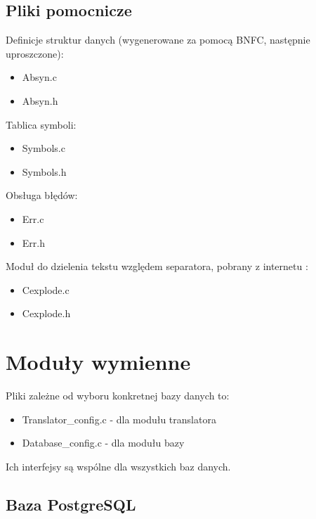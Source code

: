 \documentclass{pracamgr}
\begin{document}
\subsection{Pliki pomocnicze}
Definicje struktur danych (wygenerowane za pomocą BNFC, następnie uproszczone):
\begin{itemize}
 \item Absyn.c
\item Absyn.h
\end{itemize}
Tablica symboli:
\begin{itemize}
 \item Symbols.c
\item Symbols.h
\end{itemize}
Obsługa błędów:
\begin{itemize}
 \item Err.c
\item Err.h
\end{itemize}
Moduł do dzielenia tekstu względem separatora, pobrany z internetu \cite{cexplode}:
\begin{itemize}
 \item Cexplode.c
 \item Cexplode.h
\end{itemize}


\section{Moduły wymienne}
Pliki zależne od wyboru konkretnej bazy danych to:
\begin{itemize}
 \item Translator\_config.c - dla modułu translatora
\item Database\_config.c - dla modułu bazy
\end{itemize}
Ich interfejsy są wspólne dla wszystkich baz danych.

\subsection{Baza PostgreSQL}
\end{document}
